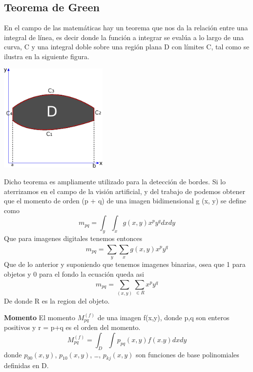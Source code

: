 \subsection{Teorema de Green}
En el campo de las matemáticas hay un teorema que nos da la relación entre una integral
de línea, es decir donde la función a integrar se evalúa a lo largo de una curva, C y una
integral doble sobre una región plana D con límites C, tal como se ilustra en la siguiente
figura.
\begin{center}
	\includegraphics[width=0.4\textwidth]{Contenido/Cuerpo/Capitulo2/Fig18.eps}
	\label{fig:MarcoTeorico:Fig25}
\end{center}
Dicho teorema es ampliamente utilizado para la detección de bordes. Si lo aterrizamos
en el campo de la visión artificial, y del trabajo de \cite{Paper::Lauren1994} podemos
obtener que el momento de orden (p + q) de una imagen bidimensional g (x, y) se define
como
\begin{equation}
	m_{pq} = \int_{y}^{} \int_{x}^{} g(x,y) x^p y^q dx dy
\end{equation}
Que para imagenes digitales tenemos entonces
\begin{equation}
	m_{pq} = \sum_{y}^{}\sum_{x}^{} g(x,y) x^p y^q
\end{equation}
Que de lo anterior y suponiendo que tenemos imagenes binarias, osea que 1 para objetos
y 0 para el fondo la ecuación queda asi
\begin{equation}
	m_{pq} = \sum_{(x,y)}^{}\sum_{\in R}^{}  x^p y^q
\end{equation}
De donde R es la region del objeto.
\begin{definition}{\textbf{Momento}}
	El momento $M_{pq}^{(f)}$ de una imagen f(x,y), donde p,q son enteros positivos y r = p+q es
	el orden del momento.
	\begin{equation}
		M_{pq}^{(f)} = \int_{D}^{} \int_{}^{} p_{pq}(x,y) f(x.y) dxdy
	\end{equation}
	donde $p_{00}(x,y)$, $p_{10}(x,y)$, \dots, $p_{kj}(x,y)$ son funciones de base polinomiales
	definidas en D.
\end{definition}

